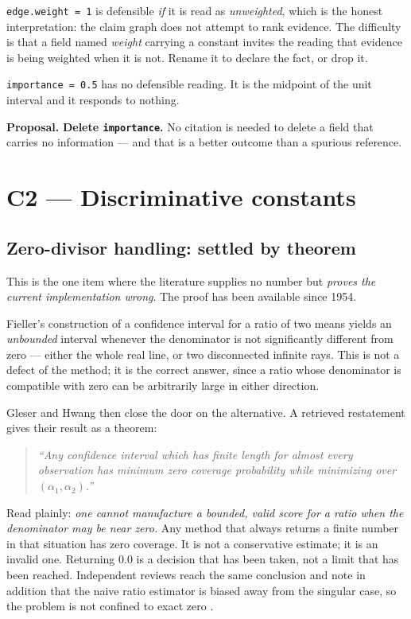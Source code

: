 \documentclass[11pt,letterpaper]{article}
\newcommand{\code}[1]{\texttt{#1}}
\begin{document}
\code{edge.weight = 1} is defensible \emph{if} it is read as \emph{unweighted},
which is the honest interpretation: the claim graph does not attempt to rank
evidence. The difficulty is that a field named \emph{weight} carrying a constant
invites the reading that evidence is being weighted when it is not. Rename it to
declare the fact, or drop it.

\code{importance = 0.5} has no defensible reading. It is the midpoint of the unit
interval and it responds to nothing.

\textbf{Proposal.} \textbf{Delete \code{importance}.} No citation is needed to
delete a field that carries no information --- and that is a better outcome than a
spurious reference.

\section{C2 --- Discriminative constants}

\subsection{Zero-divisor handling: settled by theorem}

This is the one item where the literature supplies no number but \emph{proves the
current implementation wrong}. The proof has been available since 1954.

Fieller's construction of a confidence interval for a ratio of two means yields an
\emph{unbounded} interval whenever the denominator is not significantly different
from zero \cite{fieller1954} --- either the whole real line, or two disconnected
infinite rays. This is not a defect of the method; it is the correct answer, since
a ratio whose denominator is compatible with zero can be arbitrarily large in
either direction.

Gleser and Hwang \cite{gleser1987} then close the door on the alternative. A
retrieved restatement gives their result as a theorem:

\begin{quote}\small
\emph{``Any confidence interval which has finite length for almost every
observation has minimum zero coverage probability while minimizing over
$(\alpha_1,\alpha_2)$.''}
\end{quote}

Read plainly: \emph{one cannot manufacture a bounded, valid score for a ratio when
the denominator may be near zero.} Any method that always returns a finite number
in that situation has zero coverage. It is not a conservative estimate; it is an
invalid one. Returning $0.0$ is a decision that has been taken, not a limit that
has been reached. Independent reviews reach the same conclusion and note in
addition that the naive ratio estimator is biased away from the singular case, so
the problem is not confined to exact zero \cite{axioms2025,fiellerguide}.
\end{document}
